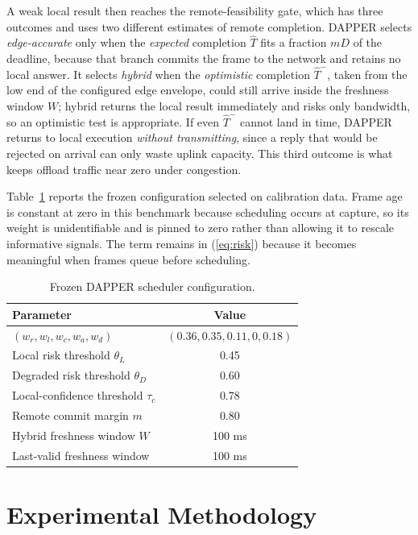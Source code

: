 \documentclass[conference,a4paper]{IEEEtran}
\begin{document}
A weak local result then reaches the remote-feasibility gate, which has three outcomes and uses two different estimates of remote completion. DAPPER selects \emph{edge-accurate} only when the \emph{expected} completion $\hat T$ fits a fraction $mD$ of the deadline, because that branch commits the frame to the network and retains no local answer. It selects \emph{hybrid} when the \emph{optimistic} completion $\hat T^{-}$, taken from the low end of the configured edge envelope, could still arrive inside the freshness window $W$; hybrid returns the local result immediately and risks only bandwidth, so an optimistic test is appropriate. If even $\hat T^{-}$ cannot land in time, DAPPER returns to local execution \emph{without transmitting}, since a reply that would be rejected on arrival can only waste uplink capacity. This third outcome is what keeps offload traffic near zero under congestion.

Table~\ref{tab:params} reports the frozen configuration selected on calibration data. Frame age is constant at zero in this benchmark because scheduling occurs at capture, so its weight is unidentifiable and is pinned to zero rather than allowing it to rescale informative signals. The term remains in (\ref{eq:risk}) because it becomes meaningful when frames queue before scheduling.

\begin{table}[t]
\centering
\caption{Frozen DAPPER scheduler configuration.}
\label{tab:params}
\scriptsize
\renewcommand{\arraystretch}{0.9}
\begin{tabular}{@{}lc@{}}
\toprule
Parameter & Value \\
\midrule
$(w_r,w_l,w_c,w_a,w_d)$ & $(0.36,0.35,0.11,0,0.18)$ \\
Local risk threshold $\theta_L$ & 0.45 \\
Degraded risk threshold $\theta_D$ & 0.60 \\
Local-confidence threshold $\tau_c$ & 0.78 \\
Remote commit margin $m$ & 0.80 \\
Hybrid freshness window $W$ & 100 ms \\
Last-valid freshness window & 100 ms \\
\bottomrule
\end{tabular}
\end{table}

\section{Experimental Methodology}
\end{document}

